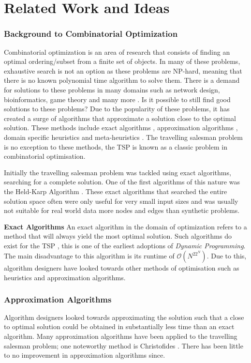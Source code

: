\documentclass[]{UCD_CS_FYP_Report}
\begin{document}
\chapter{Related Work and Ideas}
\subsection{Background to Combinatorial Optimization}
Combinatorial optimization is an area of research that consists of finding an optimal ordering/subset from a finite set of objects. In many of these problems, exhaustive search is not an option as these problems are NP-hard, meaning that there is no known polynomial time algorithm to solve them. There is a demand for solutions to these problems in many domains such as network design, bioinformatics, game theory and many more \cite{combApplications}. Is it possible to still find good solutions to these problems? Due to the popularity of these problems, it has created a surge of algorithms that approximate a solution close to the optimal solution. These methods include exact algorithms \cite{Bellman:1962:DPT:321105.321111}, approximation algorithms \cite{JohnMcGe97}, domain specific heuristics\cite{davidapplegate2007} and meta-heuristics \cite{Larranaga1999, NatureBasedHeuristics}. The travelling salesman problem is no exception to these methods, the TSP is known as a classic problem in combinatorial optimisation. 

Initially the travelling salesman problem was tackled using exact algorithms, searching for a complete solution. One of the first algorithms of this nature was the Held-Karp Algorithm \cite{Bellman:1962:DPT:321105.321111}. These exact algorithms that searched the entire solution space often were only useful for very small input sizes and was usually not suitable for real world data more nodes and edges than synthetic problems.

\textbf{Exact Algorithms}
An exact algorithm in the domain of optimization refers to a method that will always yield the most optimal solution. Such algorithms do exist for the TSP \cite{Bellman:1962:DPT:321105.321111}, this is one of the earliest adoptions of \textit{Dynamic Programming}. The main disadvantage to this algorithm is its runtime of $\mathcal{O}(N^22^N)$. Due to this, algorithm designers have looked towards other methods of optimisation such as heuristics and approximation algorithms.

\subsection{Approximation Algorithms}
Algorithm designers looked towards approximating the solution such that a close to optimal solution could be obtained in substantially less time than an exact algorithm. Many approximation algorithms have been applied to the travelling salesman problem; one noteworthy method is Christofides \cite{JohnMcGe97}. There has been little to no improvement in approximation algorithms since. 
\end{document}
